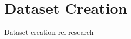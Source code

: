 \section{Dataset Creation}
\label{chp:related_research:sec:dataset_creation}
Dataset creation rel research
